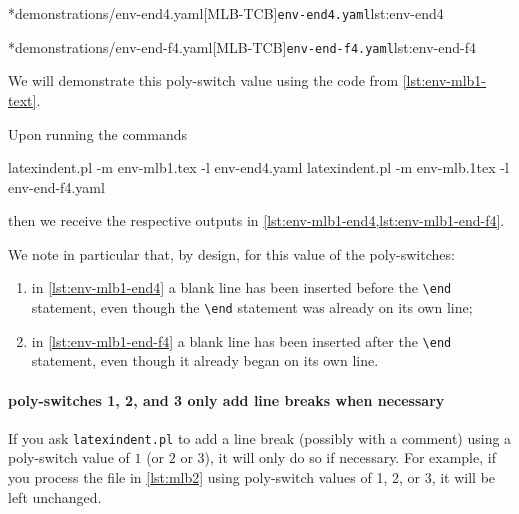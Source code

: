 		\begin{minipage}{.45\textwidth}
			\cmhlistingsfromfile[style=yaml-LST]*{demonstrations/env-end4.yaml}[MLB-TCB]{\texttt{env-end4.yaml}}{lst:env-end4}
		\end{minipage}
		\hfill
		\begin{minipage}{.5\textwidth}
			\cmhlistingsfromfile[style=yaml-LST]*{demonstrations/env-end-f4.yaml}[MLB-TCB]{\texttt{env-end-f4.yaml}}{lst:env-end-f4}
		\end{minipage}

		We will demonstrate this poly-switch value using the code from \vref{lst:env-mlb1-text}.

		Upon running the commands
		\begin{commandshell}
latexindent.pl -m env-mlb1.tex -l env-end4.yaml
latexindent.pl -m env-mlb.1tex -l env-end-f4.yaml
\end{commandshell}

		then we receive the respective outputs in \cref{lst:env-mlb1-end4,lst:env-mlb1-end-f4}.

		\begin{cmhtcbraster}[raster column skip=.1\linewidth]
		\end{cmhtcbraster}

		We note in particular that, by design, for this value of the poly-switches:
		\begin{enumerate}
			\item in \cref{lst:env-mlb1-end4} a blank line has been inserted before the
			      \lstinline!\end! statement, even though the \lstinline!\end!
			      statement was already on its own line;
			\item in \cref{lst:env-mlb1-end-f4} a blank line has been inserted after the
			      \lstinline!\end! statement, even though it already began on its own line.
		\end{enumerate}

	\paragraph{poly-switches 1, 2, and 3 only add line breaks when necessary}
		If you ask \texttt{latexindent.pl} to add a line break (possibly with a comment) using a
		poly-switch value of $1$ (or $2$ or $3$), it will only do so if necessary. For example,
		if you process the file in \vref{lst:mlb2} using poly-switch values of 1, 2, or 3, it
		will be left unchanged.

